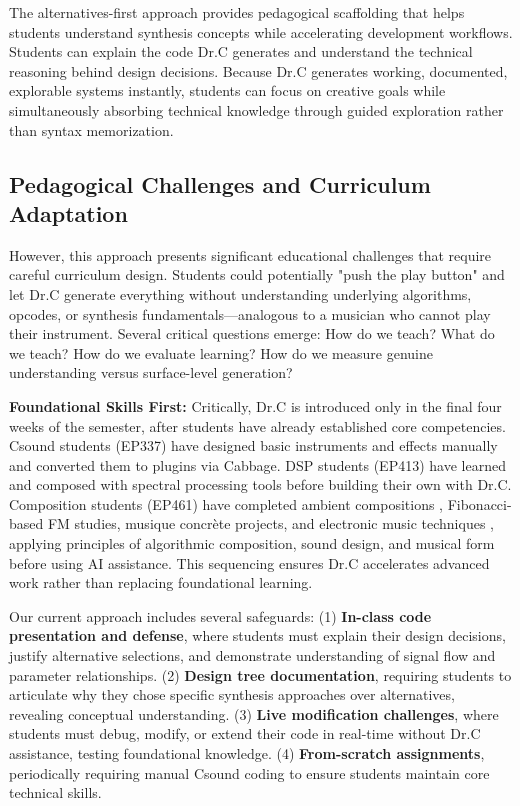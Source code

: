 \documentclass[a4paper]{article}
\begin{document}
The alternatives-first approach provides pedagogical scaffolding that helps students understand synthesis concepts while accelerating development workflows. Students can explain the code Dr.C generates and understand the technical reasoning behind design decisions. Because Dr.C generates working, documented, explorable systems instantly, students can focus on creative goals while simultaneously absorbing technical knowledge through guided exploration rather than syntax memorization.

\subsection{Pedagogical Challenges and Curriculum Adaptation}

However, this approach presents significant educational challenges that require careful curriculum design. Students could potentially "push the play button" and let Dr.C generate everything without understanding underlying algorithms, opcodes, or synthesis fundamentals—analogous to a musician who cannot play their instrument. Several critical questions emerge: How do we teach? What do we teach? How do we evaluate learning? How do we measure genuine understanding versus surface-level generation?

\textbf{Foundational Skills First:} Critically, Dr.C is introduced only in the final four weeks of the semester, after students have already established core competencies. Csound students (EP337) have designed basic instruments and effects manually and converted them to plugins via Cabbage. DSP students (EP413) have learned and composed with spectral processing tools \cite{lazzarini2017spectral,roads1996computer,roads2015composing} before building their own with Dr.C. Composition students (EP461) have completed ambient compositions \cite{eno1978ambient,warner2017ambient,pendergrast2003ambient}, Fibonacci-based FM studies, musique concrète projects, and electronic music techniques \cite{chadabe1997electric,cope1997new,cope2001directions,cope2004virtual,norden1969form}, applying principles of algorithmic composition, sound design, and musical form before using AI assistance. This sequencing ensures Dr.C accelerates advanced work rather than replacing foundational learning.

Our current approach includes several safeguards: (1) \textbf{In-class code presentation and defense}, where students must explain their design decisions, justify alternative selections, and demonstrate understanding of signal flow and parameter relationships. (2) \textbf{Design tree documentation}, requiring students to articulate why they chose specific synthesis approaches over alternatives, revealing conceptual understanding. (3) \textbf{Live modification challenges}, where students must debug, modify, or extend their code in real-time without Dr.C assistance, testing foundational knowledge. (4) \textbf{From-scratch assignments}, periodically requiring manual Csound coding to ensure students maintain core technical skills.
\end{document}

